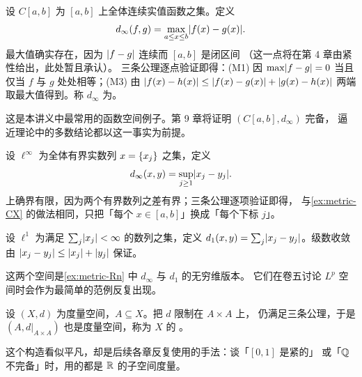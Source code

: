 \begin{example}[连续函数空间与一致度量]
  \label{ex:metric-CX}
  设 \(C[a,b]\) 为 \([a,b]\) 上全体连续实值函数之集。定义
  \begin{equation}
    \label{eq:uniform-metric}
    d_{\infty}(f,g) = \max_{a \le x \le b} \lvert f(x) - g(x)\rvert.
  \end{equation}
  最大值确实存在，因为 \(\lvert f-g\rvert\) 连续而 \([a,b]\) 是闭区间
  （这一点将在第 4 章由紧性给出，此处暂且承认）。
  三条公理逐点验证即得：(M1) 因 \(\max\lvert f-g\rvert=0\) 当且仅当 \(f\) 与 \(g\)
  处处相等；(M3) 由 \(\lvert f(x)-h(x)\rvert \le \lvert f(x)-g(x)\rvert+\lvert g(x)-h(x)\rvert\)
  两端取最大值得到。称 \(d_{\infty}\) 为。

  这是本讲义中最常用的函数空间例子。第 9 章将证明 \((C[a,b], d_{\infty})\) 完备，
  逼近理论中的多数结论都以这一事实为前提。
\end{example}

\begin{example}[序列空间]
  \label{ex:metric-sequences}
  设 \(\ell^{\infty}\) 为全体有界实数列 \(x = \{x_{j}\}\) 之集，定义
  \begin{equation}
    \label{eq:linf}
    d_{\infty}(x,y) = \sup_{j \ge 1} \lvert x_{j}-y_{j}\rvert .
  \end{equation}
  上确界有限，因为两个有界数列之差有界；三条公理逐项验证即得，
  与\cref{ex:metric-CX} 的做法相同，只把「每个 \(x \in [a,b]\)」换成「每个下标 \(j\)」。

  设 \(\ell^{1}\) 为满足 \(\sum_{j}\lvert x_{j}\rvert < \infty\) 的数列之集，定义
  \(d_{1}(x,y) = \sum_{j}\lvert x_{j}-y_{j}\rvert\)。级数收敛由
  \(\lvert x_{j}-y_{j}\rvert \le \lvert x_{j}\rvert+\lvert y_{j}\rvert\) 保证。

  这两个空间是\cref{ex:metric-Rn} 中 \(d_{\infty}\) 与 \(d_{1}\) 的无穷维版本。
  它们在卷五讨论 \(L^{p}\) 空间时会作为最简单的范例反复出现。
\end{example}

\begin{example}[子空间度量]
  \label{ex:metric-subspace}
  设 \((X,d)\) 为度量空间，\(A \subseteq X\)。把 \(d\) 限制在 \(A \times A\) 上，
  仍满足三条公理，于是 \((A, d|_{A \times A})\) 也是度量空间，称为 \(X\) 的%
  。

  这个构造看似平凡，却是后续各章反复使用的手法：谈「\([0,1]\) 是紧的」
  或「\(\mathbb{Q}\) 不完备」时，用的都是 \(\mathbb{R}\) 的子空间度量。
\end{example}

